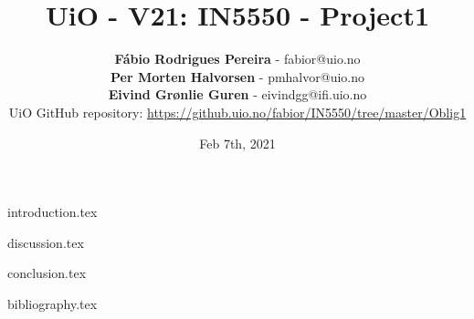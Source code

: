 \documentclass{article}
\title{UiO - V21: IN5550 - Project1}
\author{\textbf{Fábio Rodrigues Pereira} - fabior@uio.no \\
\textbf{Per Morten Halvorsen} - pmhalvor@uio.no\\
\textbf{Eivind Grønlie Guren} - eivindgg@ifi.uio.no\\
\small UiO GitHub repository: \href{https://github.uio.no/fabior/IN5550/tree/master/Oblig1}{ https://github.uio.no/fabior/IN5550/tree/master/Oblig1}}
\date{Feb 7th, 2021}
\begin{document}
\maketitle

\tableofcontents

\bigskip \bigskip

{introduction.tex}

{discussion.tex}

{conclusion.tex}

{bibliography.tex}
\end{document}
